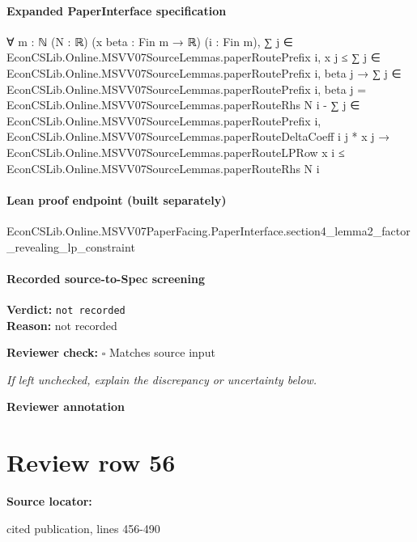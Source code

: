 \documentclass[10pt]{article}
\newcommand{\reviewerbox}{%
  \par\noindent\fbox{\parbox{0.96\linewidth}{\rule{0pt}{0.38in}}}\par
}
\newcommand{\reviewmatch}[1]{%
  \par\noindent\textbf{Reviewer check:} $\square$\; #1\par
  \noindent\emph{If left unchecked, explain the discrepancy or uncertainty below.}\par
}
\begin{document}
\paragraph{Expanded PaperInterface specification}
\begin{ReviewVerbatim}
∀ {m : ℕ} (N : ℝ) (x beta : Fin m → ℝ) (i : Fin m),
  ∑ j ∈ EconCSLib.Online.MSVV07SourceLemmas.paperRoutePrefix i, x j ≤
      ∑ j ∈ EconCSLib.Online.MSVV07SourceLemmas.paperRoutePrefix i, beta j →
    ∑ j ∈ EconCSLib.Online.MSVV07SourceLemmas.paperRoutePrefix i, beta j =
        EconCSLib.Online.MSVV07SourceLemmas.paperRouteRhs N i -
          ∑ j ∈ EconCSLib.Online.MSVV07SourceLemmas.paperRoutePrefix i,
            EconCSLib.Online.MSVV07SourceLemmas.paperRouteDeltaCoeff i j * x j →
      EconCSLib.Online.MSVV07SourceLemmas.paperRouteLPRow x i ≤ EconCSLib.Online.MSVV07SourceLemmas.paperRouteRhs N i
\end{ReviewVerbatim}

\paragraph{Lean proof endpoint (built separately)}\begin{ReviewVerbatim}
EconCSLib.Online.MSVV07PaperFacing.PaperInterface.section4_lemma2_factor_revealing_lp_constraint
\end{ReviewVerbatim}

\paragraph{Recorded source-to-Spec screening}
\textbf{Verdict:} \texttt{not recorded}
\\
\textbf{Reason:} not recorded
\reviewmatch{Matches source input}
\noindent\textbf{Reviewer annotation}\par
\reviewerbox
\clearpage
\hypertarget{source-claim-4d16e2c525e48fa8}{}
\section*{Review row 56}
\textbf{Source locator:} {\footnotesize\raggedright cited publication, lines 456-\allowbreak{}490\par}
\end{document}
